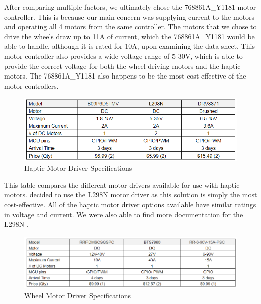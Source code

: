 \noindent After comparing multiple factors, we ultimately chose the 768861A\_Y1181 motor controller. This is because our main concern was supplying current to the motors and operating all 4 motors from the same controller. The motors that we chose to drive the wheels draw up to 11A of current, which the 768861A\_Y1181 would be able to handle, although it is rated for 10A, upon examining the data sheet. This motor controller also provides a wide voltage range of 5-30V, which is able to provide the correct voltage for both the wheel-driving motors and the haptic motors. The 768861A\_Y1181 also happens to be the most cost-effective of the motor controllers. \cite{UMLIFE} \cite{AliExpress5} \cite{Makerbase} \cite{AliExpress7} \cite{CircuitBasics} \cite{Espressif1} \cite{AliExpress4} \cite{Burgess} \cite{RandomNerd} \cite{Espressif2} \cite{SimpleFOC} \cite{SimpleFOC2} \cite{Peza}\\


\begin{figure}[H]
	\centering
	\includegraphics[width=1\textwidth]{./Images/haptic_driver_table_2.png}
	\caption{\label{fig:haptic_driver}Haptic Motor Driver Specifications}
\end{figure}

\noindent This table compares the different motor drivers available for use with haptic motors.  decided to use the L298N motor driver as this solution is simply the most cost-effective. All of the haptic motor driver options available have similar ratings in voltage and current. We were also able to find more documentation for the L298N \cite{BOJACK} \cite{BEEYDC} \cite{HiLetgo}.\\

\begin{figure}[H]
	\centering
	\includegraphics[width=1\textwidth]{./Images/wheel_driver_table.png}
	\caption{\label{fig:wheel_driver}Wheel Motor Driver Specifications}
\end{figure}


